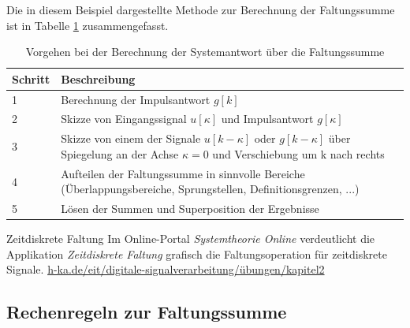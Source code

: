 Die in diesem Beispiel dargestellte Methode zur Berechnung der Faltungssumme ist in Tabelle \ref{tab:4.5} zusammengefasst.

\begin{table}
  \centering
  \caption{Vorgehen bei der Berechnung der Systemantwort über die Faltungssumme}
  \label{tab:4.5}
  \begin{tabular}{ll}
    \toprule
    Schritt & Beschreibung \\
    \midrule
    1 & Berechnung der Impulsantwort \(g[k]\) \\
    2 & Skizze von Eingangssignal \(u[κ]\) und Impulsantwort \(g[κ]\) \\
    3 & 
Skizze von einem der Signale \(u[k - κ]\) oder \(g[k - κ]\) über Spiegelung an der Achse \(κ = 0\) und 
Verschiebung um k nach rechts \\
    4 & 
Aufteilen der Faltungssumme in sinnvolle Bereiche 
(Überlappungsbereiche, Sprungstellen, Definitionsgrenzen, ...) \\
    5 & Lösen der Summen und Superposition der Ergebnisse \\
    \bottomrule
  \end{tabular}
\end{table}

\begin{application}{Zeitdiskrete Faltung}
  Im Online-Portal \emph{Systemtheorie Online} verdeutlicht die Applikation \emph{Zeitdiskrete Faltung} grafisch die Faltungsoperation für zeitdiskrete Signale.
  \tcblower
  \url{h-ka.de/eit/digitale-signalverarbeitung/übungen/kapitel2}
\end{application}


\subsection{Rechenregeln zur Faltungssumme}\label{sec:rechenregeln-zur-faltungssumme}

